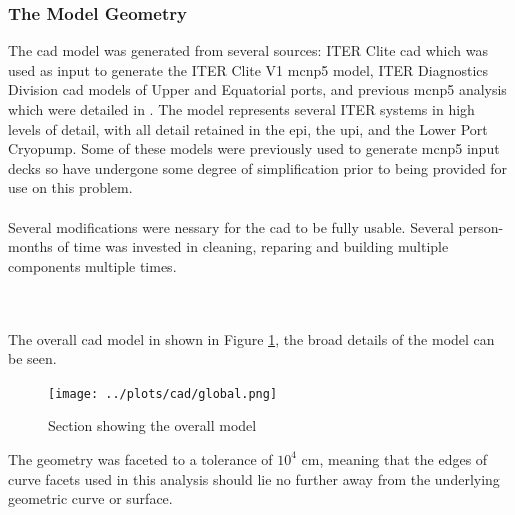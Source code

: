 \documentclass[12pt]{article}
\begin{document}
\subsubsection{The Model Geometry}
The \gls{cad} model was generated from several sources: ITER Clite \gls{cad}
which was used as input to generate the ITER Clite V1 \gls{mcnp5} model, ITER
Diagnostics Division \gls{cad} models of Upper and Equatorial ports, and
previous \gls{mcnp5} analysis which were detailed in \cite{cad_origination}. The
model represents several ITER systems in high levels of detail, with all detail
retained in the \gls{epi}, the  \gls{upi}, and the Lower Port Cryopump. Some of
these models were previously used to generate \gls{mcnp5} input decks so have
undergone some degree of simplification prior to being provided for use on this 
problem.
\\
\\
Several modifications were nessary for the \gls{cad} to be fully usable. Several
person-months of time was invested in cleaning, reparing and building multiple
components multiple times. 


\\
\\
The overall \gls{cad} model in shown in Figure \ref{fig:cad_iter_global}, the
broad details of the model can be seen. 
\begin{figure}[ht!]
  \centering
  \texttt{[image: ../plots/cad/global.png]}
  \caption{Section showing the overall model}
  \label{fig:cad_iter_global}
\end{figure}
The geometry was faceted to a tolerance of $10^4$ cm, meaning that 
the edges of curve facets used in this analysis should lie no further away from 
the underlying geometric curve or surface.


\newpage
\clearpage
\end{document}
